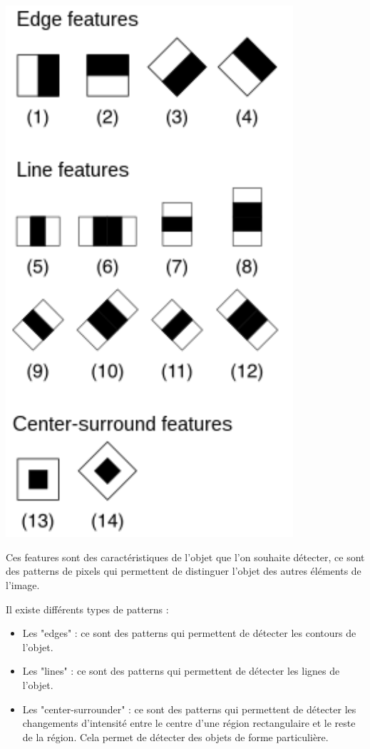 \documentclass[11pt]{article}
\begin{document}
\begin{minipage}[t]{0.45\textwidth}
    \begin{center}
        \includegraphics[width=0.8\textwidth]{images/haar_feature_2.jpg}
        \label{fig:haar_features_2}
    \end{center}
\end{minipage}

\bigbreak \bigbreak


Ces features sont des caractéristiques de l'objet que l'on souhaite détecter, ce sont des patterns de pixels qui permettent de distinguer l'objet des autres éléments de l'image.

\noindent Il existe différents types de patterns :
\begin{itemize}[label=-]
    \item Les "edges" : ce sont des patterns qui permettent de détecter les contours de l'objet.
    \item Les "lines" : ce sont des patterns qui permettent de détecter les lignes de l'objet.
    \item Les "center-surrounder" : ce sont des patterns qui permettent de détecter les changements d'intensité entre le centre d'une région rectangulaire et le reste de la région. Cela permet de détecter des objets de forme particulière.
\end{itemize}
\end{document}

